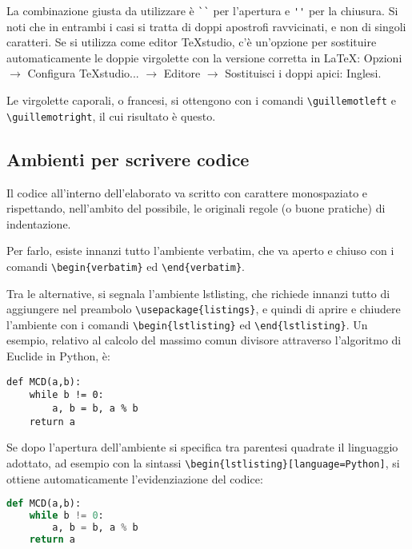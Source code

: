 \documentclass[12pt]{report}
\begin{document}
La combinazione giusta da utilizzare è \verb|``| per l'apertura e \verb|''| per la chiusura. Si noti che in entrambi i casi si tratta di doppi apostrofi ravvicinati, e non di singoli caratteri. Se si utilizza come editor TeXstudio, c'è un'opzione per sostituire automaticamente le doppie virgolette con la versione corretta in \LaTeX: Opzioni $\rightarrow$ Configura TeXstudio... $\rightarrow$ Editore $\rightarrow$ Sostituisci i doppi apici: Inglesi.

Le virgolette caporali, o francesi, si ottengono con i comandi \verb|\guillemotleft| e \break\verb|\guillemotright|, il cui risultato è \guillemotleft questo\guillemotright.


\subsection{Ambienti per scrivere codice}

Il codice all'interno dell'elaborato va scritto con carattere monospaziato e rispettando, nell'ambito del possibile, le originali regole (o buone pratiche) di indentazione.

Per farlo, esiste innanzi tutto l'ambiente verbatim, che va aperto e chiuso con i comandi \verb|\begin{verbatim}| ed \verb|\end{verbatim}|.

Tra le alternative, si segnala l'ambiente lstlisting, che richiede innanzi tutto di aggiungere nel preambolo \verb|\usepackage{listings}|, e quindi di aprire e chiudere l'ambiente con i comandi \verb|\begin{lstlisting}| ed \verb|\end{lstlisting}|. Un esempio, relativo al calcolo del massimo comun divisore attraverso l'algoritmo di Euclide in Python, è:

\begin{lstlisting}
def MCD(a,b):
    while b != 0:
        a, b = b, a % b
    return a
\end{lstlisting}

Se dopo l'apertura dell'ambiente si specifica tra parentesi quadrate il linguaggio adottato, ad esempio con la sintassi \verb|\begin{lstlisting}[language=Python]|, si ottiene automaticamente l'evidenziazione del codice:

\begin{lstlisting}[language=Python]
def MCD(a,b):
    while b != 0:
        a, b = b, a % b
    return a
\end{lstlisting}
\end{document}
